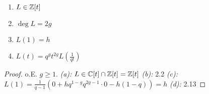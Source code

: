 \begin{lemma}
    \begin{enumerate}[label=(\alph*)]
        \item $L \in \mathbb{Z}[t]$
        \item $\deg L = 2g$
        \item $L(1) = h$
        \item $L(t) = q^gt^{2g}L\left(\frac{1}{qt}\right)$
    \end{enumerate}
\end{lemma}
\begin{proof}
    o.E. $g\geq 1$.
    \emph{(a):} $L \in \mathbb{C}[t] \cap \mathbb{Z}[t] = \mathbb{Z}[t]$\nl
    \emph{(b):} 2.2\nl
    \emph{(c):} $L(1) = \frac{1}{q-1} \left(0 + hq^{1-g}q^{2g-1}\cdot 0 - h(1-q)\right) = h$\nl
    \emph{(d):} 2.13
\end{proof}
